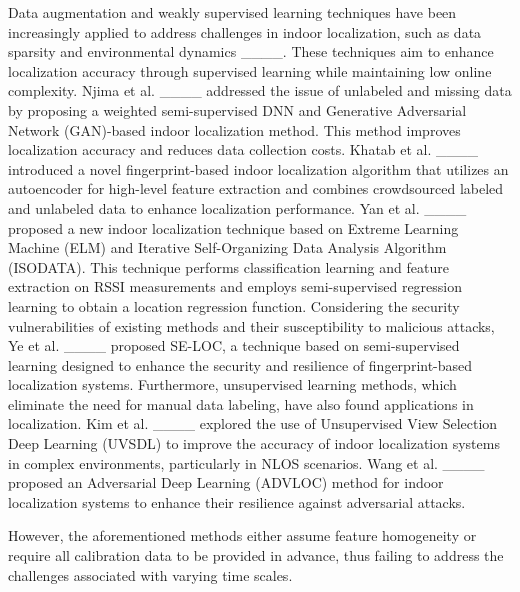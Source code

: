 Data augmentation and weakly supervised learning techniques have been increasingly applied to address challenges in indoor localization, such as data sparsity and environmental dynamics ____. These techniques aim to enhance localization accuracy through supervised learning while maintaining low online complexity.  Njima et al. ____ addressed the issue of unlabeled and missing data by proposing a weighted semi-supervised DNN and Generative Adversarial Network (GAN)-based indoor localization method. This method improves localization accuracy and reduces data collection costs. Khatab et al. ____ introduced a novel fingerprint-based indoor localization algorithm that utilizes an autoencoder for high-level feature extraction and combines crowdsourced labeled and unlabeled data to enhance localization performance. Yan et al. ____ proposed a new indoor localization technique based on Extreme Learning Machine (ELM) and Iterative Self-Organizing Data Analysis Algorithm (ISODATA). This technique performs classification learning and feature extraction on RSSI measurements and employs semi-supervised regression learning to obtain a location regression function. Considering the security vulnerabilities of existing methods and their susceptibility to malicious attacks, Ye et al. ____ proposed SE-LOC, a technique based on semi-supervised learning designed to enhance the security and resilience of fingerprint-based localization systems.  Furthermore, unsupervised learning methods, which eliminate the need for manual data labeling, have also found applications in localization. Kim et al. ____ explored the use of Unsupervised View Selection Deep Learning (UVSDL) to improve the accuracy of indoor localization systems in complex environments, particularly in NLOS scenarios. Wang et al. ____ proposed an Adversarial Deep Learning (ADVLOC) method for indoor localization systems to enhance their resilience against adversarial attacks.

However, the aforementioned methods either assume feature homogeneity or require all calibration data to be provided in advance, thus failing to address the challenges associated with varying time scales.

